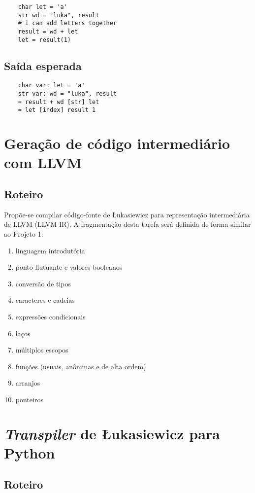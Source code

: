\documentclass{article}
\newenvironment{smallenum}{
    \vspace{-1mm}
    \begin{enumerate}[label=\roman*.]
    \setlength{\parskip}{0pt}
    \setlength{\itemsep}{2pt}
}{
    \vspace{-2mm}
    \end{enumerate}
}
\begin{document}
\begin{verbatim}
    char let = 'a'
    str wd = "luka", result
    # i can add letters together
    result = wd + let
    let = result(1)
\end{verbatim}

\subsection{Saída esperada}

\begin{verbatim}
    char var: let = 'a'
    str var: wd = "luka", result
    = result + wd [str] let
    = let [index] result 1
\end{verbatim}

\section{Geração de código intermediário com LLVM}

\subsection{Roteiro}
Propõe-se compilar código-fonte de Łukasiewicz para representação intermediária
de LLVM (LLVM IR). A fragmentação desta tarefa será definida de forma similar
ao Projeto 1:

\begin{smallenum}
    \item linguagem introdutória
    \item ponto flutuante e valores booleanos
    \item conversão de tipos
    \item caracteres e cadeias
    \item expressões condicionais
    \item laços
    \item múltiplos escopos
    \item funções (usuais, anônimas e de alta ordem)
    \item arranjos
    \item ponteiros
\end{smallenum}

\section{\emph{Transpiler} de Łukasiewicz para Python}

\subsection{Roteiro}
\end{document}
